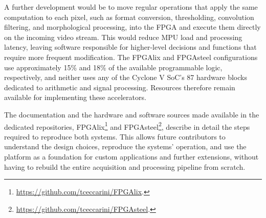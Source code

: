 A further development would be to move regular operations that apply the same computation to each pixel, such as format conversion, thresholding, convolution filtering, and morphological processing, into the FPGA and execute them directly on the incoming video stream. This would reduce MPU load and processing latency, leaving software responsible for higher-level decisions and functions that require more frequent modification. The FPGAlix and FPGAsteel configurations use approximately 15\% and 18\% of the available programmable logic, respectively, and neither uses any of the Cyclone V SoC's 87 hardware blocks dedicated to arithmetic and signal processing. Resources therefore remain available for implementing these accelerators.

The documentation and the hardware and software sources made available in the dedicated repositories, FPGAlix\footnote{\url{https://github.com/tceccarini/FPGAlix}.} and FPGAsteel\footnote{\url{https://github.com/tceccarini/FPGAsteel}.}, describe in detail the steps required to reproduce both systems. This allows future contributors to understand the design choices, reproduce the systems' operation, and use the platform as a foundation for custom applications and further extensions, without having to rebuild the entire acquisition and processing pipeline from scratch.
